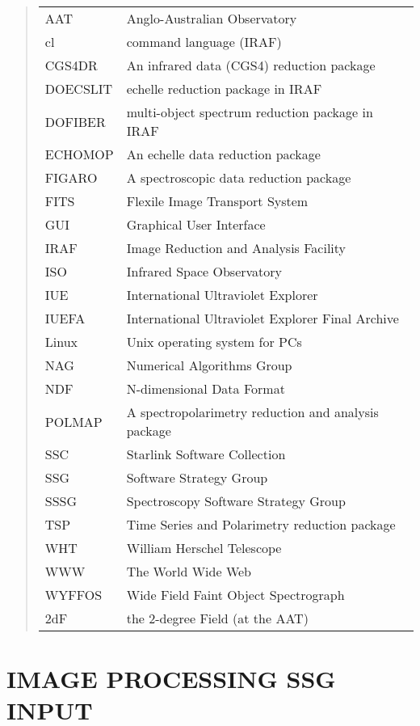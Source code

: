 \begin{quote}
\begin{tabular}{l@{--}l}
AAT & Anglo-Australian Observatory \\
cl & command language (IRAF) \\
CGS4DR & An infrared data (CGS4) reduction package \\
DOECSLIT & echelle reduction package in IRAF \\
DOFIBER & multi-object spectrum reduction package in IRAF \\
ECHOMOP & An echelle data reduction package \\
FIGARO & A spectroscopic data reduction package \\
FITS & Flexile Image Transport System \\
GUI & Graphical User Interface \\
IRAF & Image Reduction and Analysis Facility \\
ISO & Infrared Space Observatory \\
IUE & International Ultraviolet Explorer \\
IUEFA & International Ultraviolet Explorer Final Archive \\
Linux & Unix operating system for PCs \\
NAG & Numerical Algorithms Group \\
NDF & N-dimensional Data Format \\
POLMAP & A spectropolarimetry reduction and analysis package \\
SSC & Starlink Software Collection \\
SSG & Software Strategy Group \\
SSSG & Spectroscopy Software Strategy Group \\
TSP & Time Series and Polarimetry reduction package \\
WHT & William Herschel Telescope \\
WWW & The World Wide Web \\
WYFFOS & Wide Field Faint Object Spectrograph \\
2dF & the 2-degree Field (at the AAT)
\end{tabular}
\end{quote}

\newpage
\section{IMAGE PROCESSING SSG INPUT}

